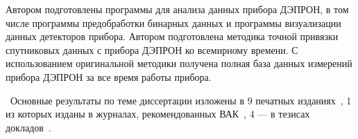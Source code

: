 Автором подготовлены программы для анализа данных прибора ДЭПРОН, в том числе программы предобработки бинарных данных и программы визуализации данных детекторов прибора. 
Автором подготовлена методика точной привязки спутниковых данных с прибора ДЭПРОН ко всемирному времени. С использованием оригинальной методики получена полная база данных измерений прибора ДЭПРОН за все время работы прибора.

\publications\ Основные результаты по теме диссертации изложены в 9 печатных изданиях~\cite{zolotarev2017numerical51590279, vlasova2017optimization27547274, vlasova2015operational11246447},
1 из которых изданы в журналах, рекомендованных ВАК~\cite{zolotarev2016chislennoe32150868}, 
4 --- в тезисах докладов~\cite{zolotarev2016modelirovanie36997161,grafodatsky2016development21020642, amelyushkin2015sozdanie10657329, angelopoulos2010university5851829, angelopoulos2011university1295357}.

